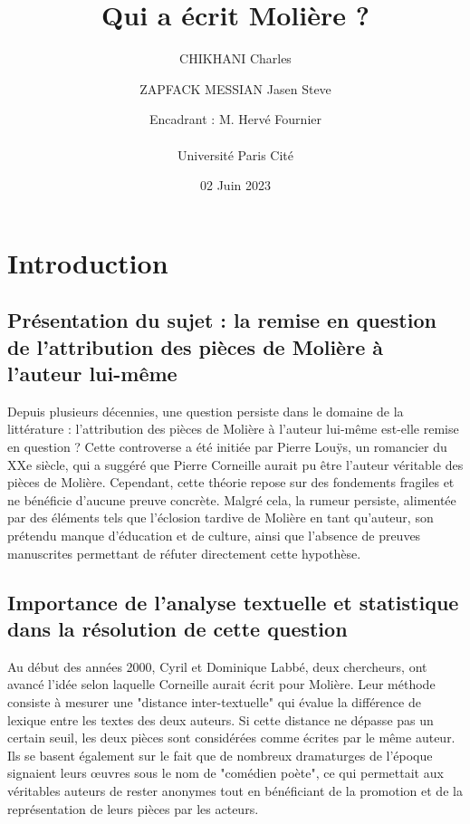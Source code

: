 \documentclass[]{report}
\title{Qui a écrit Molière ?}
\author{CHIKHANI Charles \and ZAPFACK MESSIAN Jasen Steve \\ \and Encadrant : M. Hervé Fournier\\ \\ Université Paris Cité}
\date{02 Juin 2023}
\begin{document}
	\maketitle
	
	\begin{abstract}
	\end{abstract}


	\maketitle
	\tableofcontents
	
	\newpage
\renewcommand{\thesection}{\arabic{section}}
	\section{Introduction}
	\subsection{Présentation du sujet : la remise en question de l'attribution des pièces de Molière à l'auteur lui-même}
\vspace{\baselineskip}
\hspace{0,5cm}Depuis plusieurs décennies, une question persiste dans le domaine
de la littérature : l'attribution des pièces de Molière à l'auteur lui-même
est-elle remise en question ? Cette controverse a été initiée par Pierre Louÿs,
un romancier du XXe siècle, qui a suggéré que Pierre Corneille aurait pu être
l'auteur véritable des pièces de Molière. Cependant, cette théorie repose sur
des fondements fragiles et ne bénéficie d'aucune preuve concrète. Malgré cela,
la rumeur persiste, alimentée par des éléments tels que l'éclosion tardive de
Molière en tant qu'auteur, son prétendu manque d'éducation et de culture, ainsi
que l'absence de preuves manuscrites permettant de réfuter directement cette
hypothèse.

\subsection{Importance de l'analyse textuelle et statistique dans la résolution de cette question}
\vspace{\baselineskip}
\hspace{0,5cm}Au début des années 2000, Cyril et Dominique Labbé, deux
chercheurs, ont avancé l'idée selon laquelle Corneille aurait écrit pour
Molière. Leur méthode consiste à mesurer une "distance inter-textuelle" qui
évalue la différence de lexique entre les textes des deux auteurs. Si cette
distance ne dépasse pas un certain seuil, les deux pièces sont considérées comme
écrites par le même auteur. Ils se basent également sur le fait que de nombreux
dramaturges de l'époque signaient leurs œuvres sous le nom de "comédien poète",
ce qui permettait aux véritables auteurs de rester anonymes tout en bénéficiant
de la promotion et de la représentation de leurs pièces par les acteurs.
\end{document}
